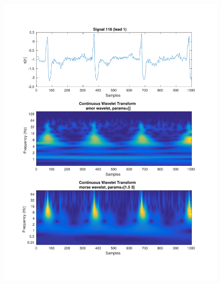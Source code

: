\documentclass{beamer}
\begin{document}
\begin{frame}
\begin{columns}
\begin{figure}
\includegraphics[width=\textwidth]{fig/118l1_cwt.pdf}
\end{figure}
\end{columns}
\end{frame}
\end{document}
